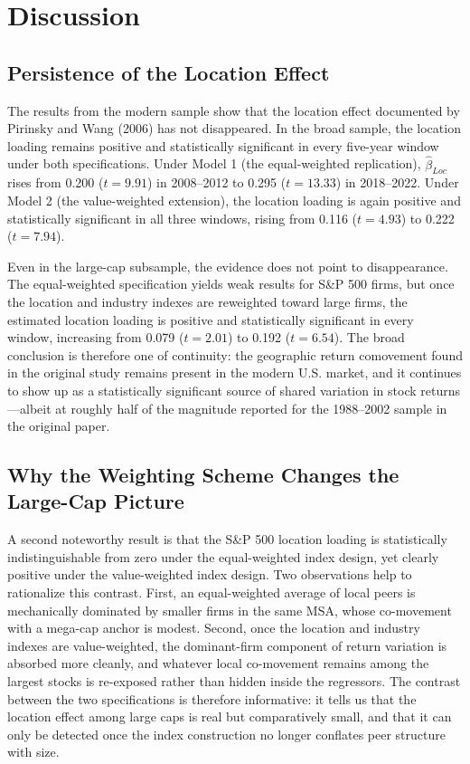 \documentclass[
  12pt,
]{article}
\begin{document}
\section{Discussion}\label{discussion}

\subsection{Persistence of the Location
Effect}\label{persistence-of-the-location-effect}

The results from the modern sample show that the location effect
documented by Pirinsky and Wang (2006) has not disappeared. In the broad
sample, the location loading remains positive and statistically
significant in every five-year window under both specifications. Under
Model 1 (the equal-weighted replication), \(\hat{\beta}_{Loc}\) rises
from 0.200 (\(t=9.91\)) in 2008--2012 to 0.295 (\(t=13.33\)) in
2018--2022. Under Model 2 (the value-weighted extension), the location
loading is again positive and statistically significant in all three
windows, rising from 0.116 (\(t=4.93\)) to 0.222 (\(t=7.94\)).

Even in the large-cap subsample, the evidence does not point to
disappearance. The equal-weighted specification yields weak results for
S\&P 500 firms, but once the location and industry indexes are
reweighted toward large firms, the estimated location loading is
positive and statistically significant in every window, increasing from
0.079 (\(t=2.01\)) to 0.192 (\(t=6.54\)). The broad conclusion is
therefore one of continuity: the geographic return comovement found in
the original study remains present in the modern U.S. market, and it
continues to show up as a statistically significant source of shared
variation in stock returns---albeit at roughly half of the magnitude
reported for the 1988--2002 sample in the original paper.

\subsection{Why the Weighting Scheme Changes the Large-Cap
Picture}\label{why-the-weighting-scheme-changes-the-large-cap-picture}

A second noteworthy result is that the S\&P 500 location loading is
statistically indistinguishable from zero under the equal-weighted index
design, yet clearly positive under the value-weighted index design. Two
observations help to rationalize this contrast. First, an equal-weighted
average of local peers is mechanically dominated by smaller firms in the
same MSA, whose co-movement with a mega-cap anchor is modest. Second,
once the location and industry indexes are value-weighted, the
dominant-firm component of return variation is absorbed more cleanly,
and whatever local co-movement remains among the largest stocks is
re-exposed rather than hidden inside the regressors. The contrast
between the two specifications is therefore informative: it tells us
that the location effect among large caps is real but comparatively
small, and that it can only be detected once the index construction no
longer conflates peer structure with size.
\end{document}

